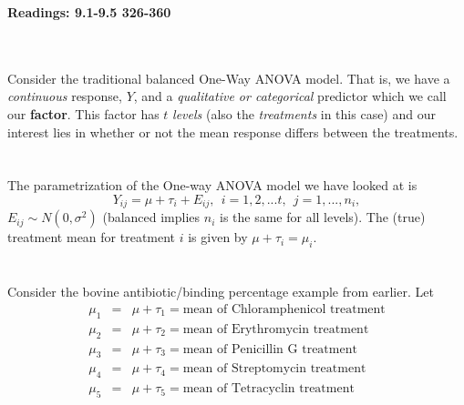 \begin{center}\large\textbf{Readings: 9.1-9.5 326-360}\\
\normalsize \end{center}
\large \hlinewd{2pt}
~\\~\\
Consider the traditional balanced One-Way ANOVA model.  That is, we have a \textit{continuous} response, $Y$, and a \textit{qualitative or categorical} predictor which we call our \textbf{factor}.  This factor has $t$ \textit{levels} (also the \textit{treatments} in this case) and our interest lies in whether or not the mean response differs between the treatments.\\~\\~\\
The parametrization of the One-way ANOVA model we have looked at is
$$Y_{ij}=\mu+\tau_{i}+E_{ij},~~i=1,2,...t,~~j=1,...,n_{i},$$
$E_{ij}\sim N(0,\sigma^2)$ (balanced implies $n_{i}$ is the same for all levels).  The (true) treatment mean for treatment $i$ is given by $\mu+\tau_{i}=\mu_{i}$.\\~\\~\\
Consider the bovine antibiotic/binding percentage example from earlier.  Let 
\begin{eqnarray*}
\mu_{1}& = & \mu+\tau_{1} =  \mbox{mean of Chloramphenicol treatment}\\
\mu_{2}& = & \mu+\tau_{2} =  \mbox{mean of Erythromycin treatment}\\
\mu_{3}& = & \mu+\tau_{3} =  \mbox{mean of Penicillin G treatment}\\
\mu_{4}& = & \mu+\tau_{4} =  \mbox{mean of Streptomycin treatment}\\
\mu_{5}& = & \mu+\tau_{5} =  \mbox{mean of Tetracyclin treatment}
\end{eqnarray*}

\newpage

